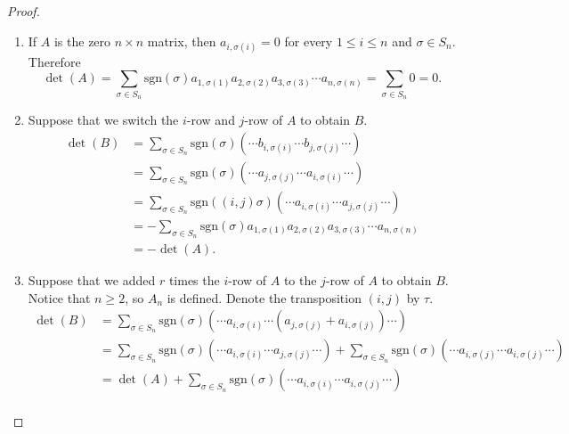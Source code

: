 \begin{proof}
    \begin{enumerate}[label={\textbf{\alph*.}}]
        \item If $A$ is the zero $n\times n$ matrix, then $a_{i,\sigma(i)} = 0$ for every $1\leq i \leq n$ and $\sigma\in S_{n}$. Therefore
              \[
                  \det(A) = \sum_{\sigma\in S_{n}}\text{sgn}(\sigma)a_{1,\sigma(1)}a_{2,\sigma(2)}a_{3,\sigma(3)}\cdots a_{n,\sigma(n)} = \sum_{\sigma\in S_{n}} 0 = 0.
              \]
        \item Suppose that we switch the $i$-row and $j$-row of $A$ to obtain $B$.
              \begingroup
              \allowdisplaybreaks{}
              \begin{align*}
                  \det(B) & = \sum_{\sigma\in S_{n}}\text{sgn}(\sigma)(\cdots b_{i,\sigma(i)}\cdots b_{j,\sigma(j)}\cdots)                 \\
                          & = \sum_{\sigma\in S_{n}}\text{sgn}(\sigma)(\cdots a_{j,\sigma(j)}\cdots a_{i,\sigma(i)}\cdots)                 \\
                          & = \sum_{\sigma\in S_{n}}\text{sgn}((i,j)\sigma)(\cdots a_{i,\sigma(i)}\cdots a_{j,\sigma(j)}\cdots)            \\
                          & = -\sum_{\sigma\in S_{n}}\text{sgn}(\sigma)a_{1,\sigma(1)}a_{2,\sigma(2)}a_{3,\sigma(3)}\cdots a_{n,\sigma(n)} \\
                          & = -\det(A).
              \end{align*}
              \endgroup
        \item Suppose that we added $r$ times the $i$-row of $A$ to the $j$-row of $A$ to obtain $B$. Notice that $n\geq 2$, so $A_{n}$ is defined. Denote the transposition $(i,j)$ by $\tau$.
              \begingroup
              \allowdisplaybreaks{}
              \begin{align*}
                  \det(B) & = \sum_{\sigma\in S_{n}}\text{sgn}(\sigma)(\cdots a_{i,\sigma(i)}\cdots (a_{j,\sigma(j)} + a_{i,\sigma(j)})\cdots)                                                                              \\
                          & = \sum_{\sigma\in S_{n}}\text{sgn}(\sigma)(\cdots a_{i,\sigma(i)}\cdots a_{j,\sigma(j)}\cdots) + \sum_{\sigma\in S_{n}}\text{sgn}(\sigma)(\cdots a_{i,\sigma(j)}\cdots a_{i,\sigma(j)}\cdots)   \\
                          & = \det(A) + \sum_{\sigma\in S_{n}}\text{sgn}(\sigma)(\cdots a_{i,\sigma(i)}\cdots a_{i,\sigma(j)}\cdots)                                                                                        \\

\end{align*}
\end{enumerate}
\end{proof}

